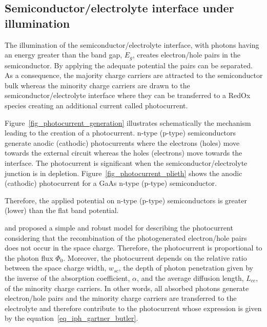
\clearpage


\subsection{Semiconductor/electrolyte interface under illumination}
The illumination of the semiconductor/electrolyte interface, 
with photons having an energy greater than the band gap, $E_g$, creates 
electron/hole pairs in the semiconductor. 
By applying the adequate potential the pairs can be separated. 
As a consequence, the majority charge carriers are attracted to the 
semiconductor bulk whereas the minority charge carriers are drawn to the 
semiconductor/electrolyte interface where they can be transferred to a RedOx 
species creating an additional current called photocurrent.  

Figure~\ref{fig_photocurrent_generation} illustrates schematically the 
mechanism leading to the creation of a photocurrent. n-type (p-type) 
semiconductors generate anodic (cathodic) photocurrents where the 
electrons (holes) move towards the external circuit whereas the holes (electrons) 
move towards the interface. 
The photocurrent is significant when the semiconductor/electrolyte junction 
is in depletion. 
Figure~\ref{fig_photocurrent_plieth} shows the anodic (cathodic) photocurrent 
for a GaAs n-type (p-type) semiconductor.

Therefore, the applied potential on n-type (p-type) semiconductors is 
greater (lower) than the flat band potential.





\citet{gartner1959} and \citet{butler1977} proposed a simple and robust model for 
describing the photocurrent considering that the recombination of the 
photogenerated electron/hole pairs does not occur in the space charge. 
Therefore, the photocurrent is proportional to the photon flux $\Phi _0$. 
Moreover, the photocurrent depends on the relative ratio between the space 
charge width, $w_{sc}$, the depth of photon penetration given by the inverse 
of the absorption coefficient, $ \alpha $, and the average diffusion length, 
$L_{cc}$, of the minority charge carriers. 
In other words, all absorbed photons generate electron/hole pairs and 
the minority charge carriers are transferred to the electrolyte and 
therefore contribute to the photocurrent whose expression is given 
by the equation~\ref{eq_iph_gartner_butler}.

